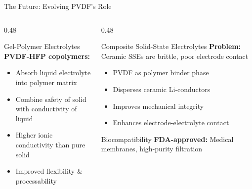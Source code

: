 \documentclass[aspectratio=169]{beamer}
\begin{document}
\begin{frame}{The Future: Evolving PVDF's Role}
    \begin{columns}[T]
        \begin{column}{0.48\textwidth}
            \begin{block}{Gel-Polymer Electrolytes}
                \textbf{PVDF-HFP copolymers:}
                \begin{itemize}\small
                    \item Absorb liquid electrolyte into polymer matrix
                    \item Combine safety of solid with conductivity of liquid
                    \item Higher ionic conductivity than pure solid
                    \item Improved flexibility \& processability
                \end{itemize}
            \end{block}
        \end{column}
        
        \begin{column}{0.48\textwidth}
            \begin{block}{Composite Solid-State Electrolytes}
                \textbf{Problem:} Ceramic SSEs are brittle, poor electrode contact
                \begin{itemize}\small
                    \item PVDF as polymer binder phase
                    \item Disperses ceramic Li-conductors
                    \item Improves mechanical integrity
                    \item Enhances electrode-electrolyte contact
                \end{itemize}
            \end{block}
            
            \begin{exampleblock}{Biocompatibility}
                \footnotesize \textbf{FDA-approved:} Medical membranes, high-purity filtration
            \end{exampleblock}
        \end{column}
    \end{columns}
\end{frame}
\end{document}
